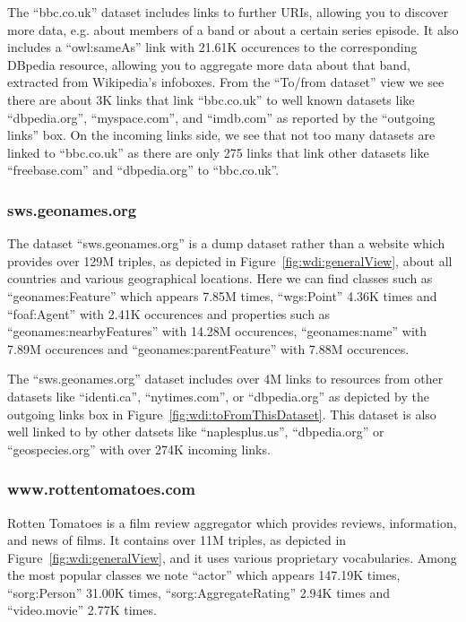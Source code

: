 The ``bbc.co.uk'' dataset includes links to further URIs, allowing you to discover more data, e.g. about members of a band or about a certain series episode. It also includes a ``owl:sameAs'' link with 21.61K occurences to the corresponding DBpedia resource, allowing you to aggregate more data about that band, extracted from Wikipedia's infoboxes. From the ``To/from dataset'' view we see there are about 3K links that link ``bbc.co.uk'' to well known datasets like ``dbpedia.org'', ``myspace.com'', and ``imdb.com'' as reported by the ``outgoing links'' box. On the incoming links side, we see that not too many datasets are linked to ``bbc.co.uk'' as there are only 275 links that link other datasets like ``freebase.com'' and ``dbpedia.org'' to ``bbc.co.uk''.

\subsubsection{sws.geonames.org}

The dataset ``sws.geonames.org'' is a dump dataset rather than a website which provides over 129M triples, as depicted in Figure~\ref{fig:wdi:generalView}, about all countries and various geographical locations. Here we can find classes such as ``geonames:Feature'' which appears 7.85M times, ``wgs:Point'' 4.36K times and ``foaf:Agent'' with 2.41K occurences and properties such as ``geonames:nearbyFeatures'' with 14.28M occurences, ``geonames:name'' with 7.89M occurences and ``geonames:parentFeature'' with 7.88M occurences.

The ``sws.geonames.org'' dataset includes over 4M links to resources from other datasets like ``identi.ca'', ``nytimes.com'', or ``dbpedia.org'' as depicted by the outgoing links box in Figure~\ref{fig:wdi:toFromThisDataset}. This dataset is also well linked to by other datsets like ``naplesplus.us'', ``dbpedia.org'' or ``geospecies.org'' with over 274K incoming links.

\subsubsection{www.rottentomatoes.com}

Rotten Tomatoes is a film review aggregator which provides reviews, information, and news of films. It contains over 11M triples, as depicted in Figure~\ref{fig:wdi:generalView}, and it uses various proprietary vocabularies. Among the most popular classes we note ``actor'' which appears 147.19K times, ``sorg:Person'' 31.00K times, ``sorg:AggregateRating'' 2.94K times and ``video.movie'' 2.77K times.

